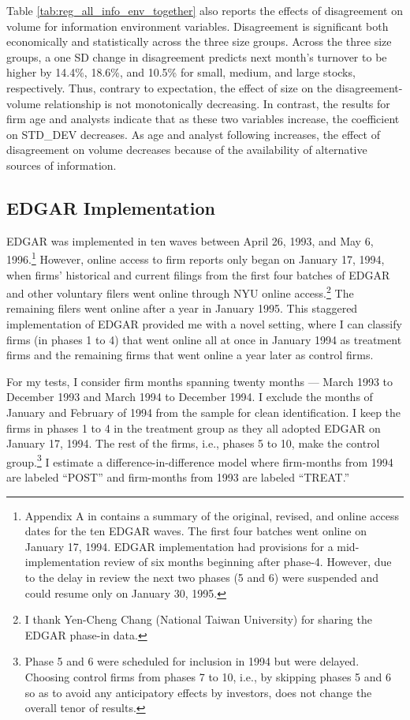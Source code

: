 \documentclass[
  12pt,
  a4paper,
  twoside,
  onecolumn]{article}
\begin{document}
Table \ref{tab:reg_all_info_env_together} also reports the effects of
disagreement on volume for information environment variables.
Disagreement is significant both economically and statistically across
the three size groups. Across the three size groups, a one SD change in
disagreement predicts next month's turnover to be higher by 14.4\%,
18.6\%, and 10.5\% for small, medium, and large stocks, respectively.
Thus, contrary to expectation, the effect of size on the
disagreement-volume relationship is not monotonically decreasing. In
contrast, the results for firm age and analysts indicate that as these
two variables increase, the coefficient on STD\_DEV decreases. As age
and analyst following increases, the effect of disagreement on volume
decreases because of the availability of alternative sources of
information.

\hypertarget{sec:edgar_implementation}{%
\subsection{EDGAR Implementation}\label{sec:edgar_implementation}}

EDGAR was implemented in ten waves between April 26, 1993, and May 6,
1996.\footnote{Appendix A in \cite{chang_2020_rfs} contains a summary of
  the original, revised, and online access dates for the ten EDGAR
  waves. The first four batches went online on January 17, 1994. EDGAR
  implementation had provisions for a mid-implementation review of six
  months beginning after phase-4. However, due to the delay in review
  the next two phases (5 and 6) were suspended and could resume only on
  January 30, 1995.} However, online access to firm reports only began
on January 17, 1994, when firms' historical and current filings from the
first four batches of EDGAR and other voluntary filers went online
through NYU online access.\footnote{I thank Yen-Cheng Chang (National
  Taiwan University) for sharing the EDGAR phase-in data.} The remaining
filers went online after a year in January 1995. This staggered
implementation of EDGAR provided me with a novel setting, where I can
classify firms (in phases 1 to 4) that went online all at once in
January 1994 as treatment firms and the remaining firms that went online
a year later as control firms.

For my tests, I consider firm months spanning twenty months --- March
1993 to December 1993 and March 1994 to December 1994. I exclude the
months of January and February of 1994 from the sample for clean
identification. I keep the firms in phases 1 to 4 in the treatment group
as they all adopted EDGAR on January 17, 1994. The rest of the firms,
i.e., phases 5 to 10, make the control group.\footnote{Phase 5 and 6
  were scheduled for inclusion in 1994 but were delayed. Choosing
  control firms from phases 7 to 10, i.e., by skipping phases 5 and 6 so
  as to avoid any anticipatory effects by investors, does not change the
  overall tenor of results.} I estimate a difference-in-difference model
where firm-months from 1994 are labeled ``POST'' and firm-months from
1993 are labeled ``TREAT.''
\end{document}
